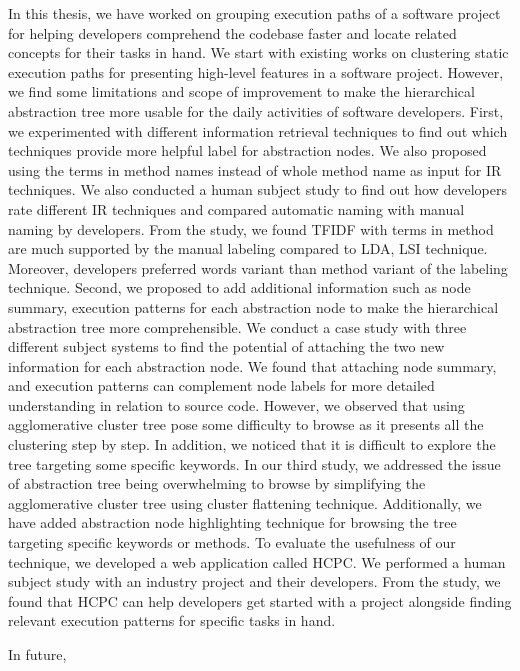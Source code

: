 \label{chapter:conclusion}
In this thesis, we have worked on grouping execution paths of a software project for helping developers comprehend the codebase faster and locate related concepts for their tasks in hand. We start with existing works on clustering static execution paths for presenting high-level features in a software project. However, we find some limitations and scope of improvement to make the hierarchical abstraction tree more usable for the daily activities of software developers. First, we experimented with different information retrieval techniques to find out which techniques provide more helpful label for abstraction nodes. We also proposed using the terms in method names instead of whole method name as input for IR techniques. We also conducted a human subject study to find out how developers rate different IR techniques and compared automatic naming with manual naming by developers. From the study, we found TFIDF with terms in method are much supported by the manual labeling compared to LDA, LSI technique. Moreover, developers preferred words variant than method variant of the labeling technique. Second, we proposed to add additional information such as node summary, execution patterns for each abstraction node to make the hierarchical abstraction tree more comprehensible. We conduct a case study with three different subject systems to find the potential of attaching the two new information for each abstraction node. We found that attaching node summary, and execution patterns can complement node labels for more detailed understanding in relation to source code. However, we observed that using agglomerative cluster tree pose some difficulty to browse as it presents all the clustering step by step. In addition, we noticed that it is difficult to explore the tree targeting some specific keywords. In our third study, we addressed the issue of abstraction tree being overwhelming to browse by simplifying the agglomerative cluster tree using cluster flattening technique. Additionally, we have added abstraction node highlighting technique for browsing the tree targeting specific keywords or methods. To evaluate the usefulness of our technique, we developed a web application called HCPC. We performed a human subject study with an industry project and their developers. From the study, we found that HCPC can help developers get started with a project alongside finding relevant execution patterns for specific tasks in hand.

In future, 